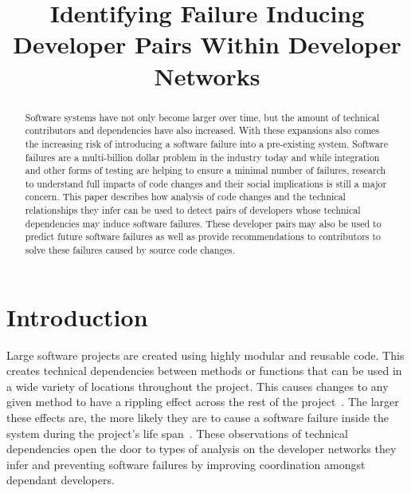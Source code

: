\documentclass[conference]{IEEEtran}
\begin{document}
\title{Identifying Failure Inducing Developer Pairs Within Developer Networks}

\author{
}

\maketitle


\begin{abstract}
Software systems have not only become larger over time, but the amount of
technical contributors and dependencies have also increased. With these expansions also comes
the increasing risk of introducing a software failure into a pre-existing system.
Software failures are a multi-billion dollar problem in the industry today and while integration and
other forms of testing are helping to ensure a minimal number of failures, research to understand
full impacts of code changes and their social implications is still a major concern. This paper describes
how analysis of code changes and the technical relationships they infer can be used to detect pairs
of developers whose technical dependencies may induce software failures. These developer pairs may
also be used to predict future software failures as well as provide recommendations to contributors
to solve these failures caused by source code changes.
\end{abstract}


\section{Introduction}

Large software projects are created using highly modular and 
reusable code. This creates technical dependencies between methods or functions
that can be used in a wide variety of locations throughout the project. 
This causes changes to any given method to have a rippling 
effect across the rest of the project~\cite{Acharya:2011:PCI}. The larger these effects are,
the more likely they are to cause a software failure inside the system during the project's
life span~\cite{Zimmermann:2008:PDU}. These observations of technical dependencies open
the door to types of analysis on the developer networks they infer and preventing software
failures by improving coordination amongst dependant developers.
\end{document}
